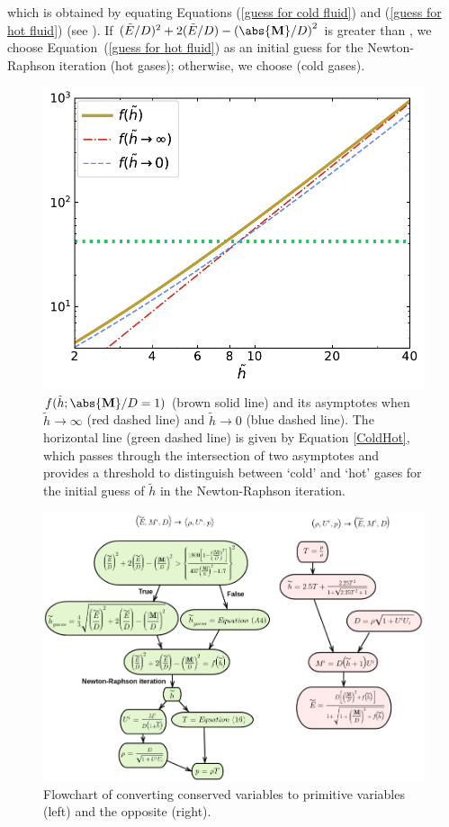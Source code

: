 which is obtained by equating Equations (\ref{guess for cold fluid}) and (\ref{guess for hot fluid}) (see ). If $(\tilde{E}/D)^2+2(\tilde{E}/D)-\left(\abs{\mathbf{M}}/D\right)^2$ is greater than , we choose Equation~(\ref{guess for hot fluid}) as an initial guess for the Newton-Raphson iteration (hot gases); otherwise, we choose  (cold gases).
\begin{figure}
\includegraphics[scale=0.7]{srhd-figures/FunHTilde.pdf}
\caption{$f(\tilde{h};\abs{\mathbf{M}}/D=1)$ (brown solid line) and its asymptotes when $\tilde{h}\rightarrow \infty$ (red dashed line) and $\tilde{h}\rightarrow 0$ (blue dashed line). The horizontal line (green dashed line) is given by Equation \ref{ColdHot}, which passes through the intersection of two asymptotes and provides a threshold to distinguish between `cold' and `hot' gases for the initial guess of $\tilde{h}$ in the Newton-Raphson iteration.}
\label{fig:FunHTilde}
\end{figure}


\begin{figure}
\includegraphics[width=\linewidth]{srhd-figures/screenshot.png}
\caption{Flowchart of converting conserved variables to primitive variables (left) and the opposite (right).}
\label{fig:flowchart}
\end{figure}

